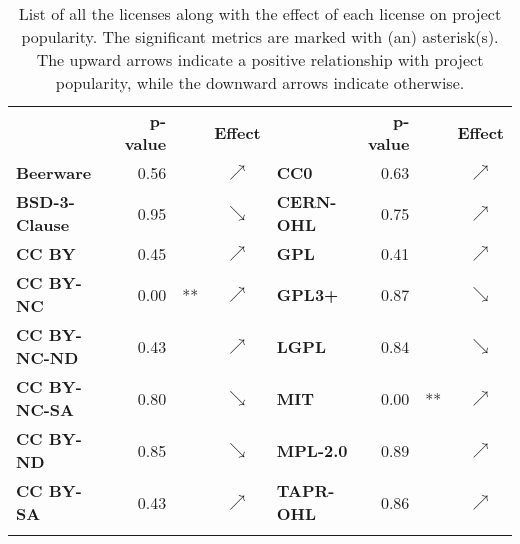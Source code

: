 \begin{table}[t]
	\centering
	\caption{List of all the licenses along with the effect of each license on project popularity. The significant metrics are marked with (an) asterisk(s). The upward arrows indicate a positive relationship with project popularity, while the downward arrows indicate otherwise.}
	\setlength{\tabcolsep}{2pt}
	\label{table:license}
	\begin{tabular}{|>{\bfseries}l|rl|c||>{\bfseries}l|rl|c|}
		\hline
		\multirow{2}{*}{License}      & \multirow{2}{*}{\textbf{p-value}}  &    & \multirow{2}{*}{\textbf{Effect}}     & \multirow{2}{*}{License}  & \multirow{2}{*}{\textbf{p-value}}  &    & \multirow{2}{*}{\textbf{Effect}}     \\
		&&&&&&&\\ \hline\hline
		Beerware     & 0.56 &    & $\nearrow$ & CC0      & 0.63 &    & $\nearrow$ \\
		BSD-3-Clause & 0.95 &    & $\searrow$ & CERN-OHL & 0.75 &    & $\nearrow$ \\
		CC BY        & 0.45 &    & $\nearrow$ & GPL      & 0.41 &    & $\nearrow$ \\
		CC BY-NC     & 0.00 & ** & $\nearrow$ & GPL3+    & 0.87 &    & $\searrow$ \\
		CC BY-NC-ND  & 0.43 &    & $\nearrow$ & LGPL     & 0.84 &    & $\searrow$ \\
		CC BY-NC-SA  & 0.80 &    & $\searrow$ & MIT      & 0.00 & ** & $\nearrow$ \\
		CC BY-ND     & 0.85 &    & $\searrow$ & MPL-2.0  & 0.89 &    & $\nearrow$ \\
		CC BY-SA     & 0.43   &    & $\nearrow$ &TAPR-OHL          &  0.86        &    & $\nearrow$          \\ \hline
		\multicolumn{8}{l}{$p-value$ codes:  `***'$<0$, `**'$<0.001$, `*'$<0.01$, `.'$<0.05$}\\ 
	\end{tabular}
\vspace{-0.1cm}
\end{table}